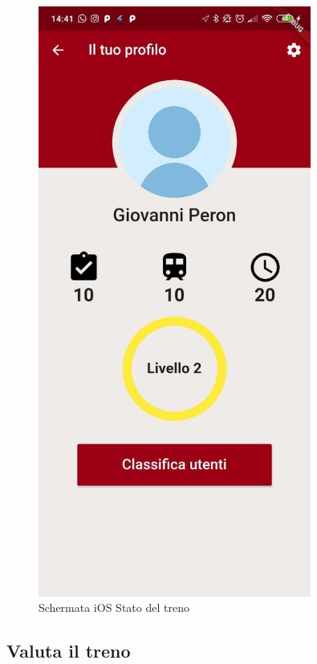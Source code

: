 \begin{minipage}{0.45\textwidth}
	\begin{figure}[H]
		\centering
		\includegraphics[width=0.8\textwidth]{immagini/profile.jpg}
		\caption{Schermata iOS Stato del treno}
	\end{figure}
\end{minipage}

\subsection{Valuta il treno}

